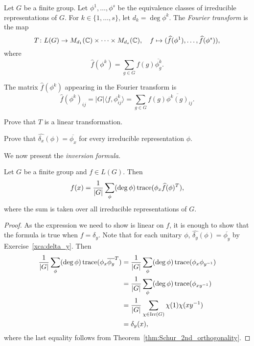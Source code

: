 \begin{definition}
  Let $G$ be a finite group. Let $\phi^1,\dots,\phi^s$ be the equivalence classes 
  of irreducible representations of $G$. For $k\in\{1,\dots,s\}$, let 
  $d_k=\deg\phi^k$. 
  The \emph{Fourier transform} is the map  
  \[
    T\colon L(G)\to M_{d_1}(\mathbb{C})\times\cdots\times M_{d_s}(\mathbb{C}),
    \quad
    f\mapsto (\widehat{f}(\phi^1),\dots,\widehat{f}(\phi^s)),
  \]
  where  
  \[
    \widehat{f}(\phi^k)=\sum_{g\in G}f(g)\overline{\phi_g^k}.
  \]
\end{definition}

The matrix 
  $\widehat{f}(\phi^k)$ appearing in the Fourier transform is 
  \[
    \widehat{f}(\phi^k)_{ij}=|G|\langle f,\phi_{ij}^k\rangle=\sum_{g\in G}f(g)\overline{\phi^k(g)}_{ij}.
  \]


\begin{exercise}
  \label{xca:Tlineal}
  Prove that $T$ is a linear transformation. 
\end{exercise}

\begin{exercise}
\label{xca:delta_y}
  Prove that $\widehat{\delta_x}(\phi)=\overline{\phi_x}$ for every
  irreducible representation $\phi$.  
\end{exercise}

We now present the \emph{inversion formula}. 

\begin{theorem}
  \label{thm:inversion}
  Let $G$ be a finite group and $f\in L(G)$. Then 
  \[
    f(x)=\frac{1}{|G|}\sum_{\phi}(\deg\phi)\operatorname{trace}(\phi_x \widehat{f}(\phi)^T),
  \]
  where the sum is taken over all irreducible representations of $G$. 
\end{theorem}

\begin{proof}
  As the expression we need to show is linear on $f$, it is enough to 
  show that the formula is true when 
  $f=\delta_y$. Note that for each unitary $\phi$,   
  $\widehat{\delta_y}(\phi)=\overline{\phi_y}$ by Exercise~\ref{xca:delta_y}. Then 
  \begin{align*}
    \frac{1}{|G|}\sum_{\phi}(\deg\phi)\operatorname{trace}(\phi_x\overline{\phi_y}^T)
    &=\frac{1}{|G|}\sum_{\phi}(\deg\phi)\operatorname{trace}(\phi_x\phi_{y^{-1}})\\
    &=\frac{1}{|G|}\sum_{\phi}(\deg\phi)\operatorname{trace}(\phi_{xy^{-1}})\\
    &=\frac{1}{|G|}\sum_{\chi\in\operatorname{Irr}(G)}\chi(1)\chi(xy^{-1})\\
    &=\delta_y(x),
  \end{align*}
  where the last equality follows from Theorem~\ref{thm:Schur_2nd_orthogonality}.
\end{proof}

